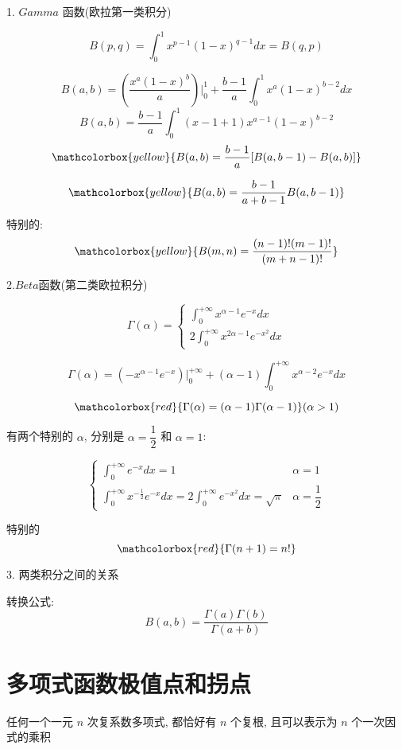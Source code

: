 \begin{definition}	
	1. $Gamma$ 函数(欧拉第一类积分)

	$$B(p,q) = \int_{0}^{1}x^{p-1}(1-x)^{q-1}dx=B(q,p)$$
	
	$$B(a,b) = (\dfrac{x^a(1-x)^b}{a})\big|_{0}^{1} + \dfrac{b-1}{a}\int_{0}^{1}x^{a}(1-x)^{b-2}dx$$
	$$B(a,b) = \dfrac{b-1}{a}\int_{0}^{1}(x-1+1)x^{a-1}(1-x)^{b-2}$$
	$$\mathcolorbox{yellow}{B(a,b) = \dfrac{b-1}{a}[B(a,b-1)-B(a,b)]}$$ 
	
	$$\mathcolorbox{yellow}{B(a,b) = \dfrac{b-1}{a+b-1}B(a,b-1)}$$
	
	特别的:  $$\mathcolorbox{yellow}{B(m,n) = \dfrac{(n-1)!(m-1)!}{(m+n-1)!}}$$
	
	2.$Beta$函数(第二类欧拉积分)

	$$\Gamma(\alpha) = 
	\begin{cases} 
		\int_{0}^{+\infty}x^{\alpha-1}e^{-x}dx\\ 
		2\int_{0}^{+\infty}x^{2\alpha-1}e^{-x^{2}}dx
	\end{cases}$$
	
	$$\Gamma(\alpha) = (-x^{\alpha-1}e^{-x})\big|_{0}^{+\infty}+(\alpha-1)\int_{0}^{+\infty}x^{\alpha-2}e^{-x}dx$$
	
	$$\mathcolorbox{red}{\Gamma(\alpha) = (\alpha-1)\Gamma(\alpha-1)} (\alpha>1)$$

	有两个特别的 $\alpha$, 分别是 $\alpha = \dfrac{1}{2}$ 和 $\alpha = 1$:

	$$\begin{cases} 
		\int_{0}^{+\infty}e^{-x}dx = 1 & \alpha =1 \\ 
		\int_{0}^{+\infty}x^{-\frac{1}{2}}e^{-x}dx = 2\int_{0}^{+\infty}e^{-x^{2}}dx = \sqrt{\pi} & \alpha =\dfrac{1}{2}
	\end{cases}$$
	
	特别的  $$\mathcolorbox{red}{\Gamma(n+1)=n!}$$
	
	3. 两类积分之间的关系
	
	转换公式:  
	$$B(a,b)=\frac{\Gamma(a)\Gamma(b)}{\Gamma(a+b)}$$
	
\end{definition}

\section{多项式函数极值点和拐点}


\begin{theorem}[代数基本定理]\label{the: 代数基本定理}
	任何一个一元 $n$ 次复系数多项式, 都恰好有 $n$ 个复根, 且可以表示为 $n$ 个一次因式的乘积
\end{theorem}

